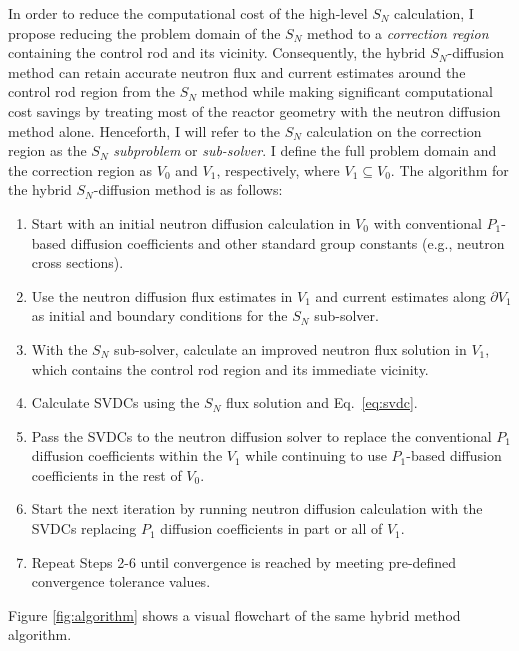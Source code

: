 In order to reduce the computational cost of the high-level $S_N$ calculation, I propose reducing
the problem domain of the $S_N$ method to a \textit{correction region} containing the control rod
and its vicinity. Consequently, the hybrid $S_N$-diffusion method can retain accurate neutron flux
and current estimates around the control rod region from the $S_N$ method while making significant
computational cost savings by treating most of the reactor geometry with the neutron diffusion
method alone. Henceforth, I will refer to the $S_N$ calculation on the correction
region as the $S_N$ \textit{subproblem} or \textit{sub-solver}. I define the full problem
domain and the correction region as $V_0$ and $V_1$, respectively, where
$V_1\subseteq V_0$. The algorithm for the hybrid $S_N$-diffusion method is as follows:
%
\begin{enumerate}
  \item Start with an initial neutron diffusion calculation in $V_0$ with conventional
    $P_1$-based diffusion coefficients and other standard group constants (e.g., neutron cross
    sections).
  \item Use the neutron diffusion flux estimates in $V_1$ and current estimates along
    $\partial V_1$ as initial and boundary conditions for the $S_N$ sub-solver.
  \item With the $S_N$ sub-solver, calculate an improved neutron flux solution in $V_1$,
    which contains the control rod region and its immediate vicinity.
  \item Calculate \glspl{SVDC} using the $S_N$ flux solution and Eq.\ \ref{eq:svdc}.
  \item Pass the \glspl{SVDC} to the neutron diffusion solver to replace the conventional
    $P_1$ diffusion coefficients within the $V_1$ while continuing to use $P_1$-based
    diffusion coefficients in the rest of $V_0$.
  \item Start the next iteration by running neutron diffusion calculation with the \glspl{SVDC}
    replacing $P_1$ diffusion coefficients in part or all of $V_1$.
  \item Repeat Steps 2-6 until convergence is reached by meeting pre-defined convergence tolerance
    values.
\end{enumerate}
%
Figure \ref{fig:algorithm} shows a visual flowchart of the same hybrid method algorithm.

